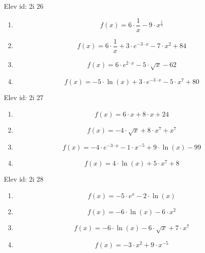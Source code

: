 \item Elev id: 2i 26
\begin{enumerate}
\item 
$$
f(x)=6\cdot \frac{1}{x}-9\cdot x^{\frac{1}{2}}
$$
\item 
$$
f(x)=6\cdot \frac{1}{x}+3\cdot e^{-3\cdot x}-7\cdot x^2+84
$$
\item 
$$
f(x)=6\cdot e^{2\cdot x}-5\cdot \sqrt{x}-62
$$
\item 
$$
f(x)=-5\cdot \ln(x)+3\cdot e^{-3\cdot x}-5\cdot x^7+80
$$
\end{enumerate}
\item Elev id: 2i 27
\begin{enumerate}
\item 
$$
f(x)=6\cdot x+8\cdot x+24
$$
\item 
$$
f(x)=-4\cdot \sqrt{x}+8\cdot x^7+x^7
$$
\item 
$$
f(x)=-4\cdot e^{-3\cdot x}-1\cdot x^{-5}+9\cdot \ln(x)-99
$$
\item 
$$
f(x)=4\cdot \ln(x)+5\cdot x^7+8
$$
\end{enumerate}
\item Elev id: 2i 28
\begin{enumerate}
\item 
$$
f(x)=-5\cdot e^x-2\cdot \ln(x)
$$
\item 
$$
f(x)=-6\cdot \ln(x)-6\cdot x^2
$$
\item 
$$
f(x)=-6\cdot \ln(x)-6\cdot \sqrt{x}+7\cdot x^7
$$
\item 
$$
f(x)=-3\cdot x^2+9\cdot x^{-5}
$$
\end{enumerate}
